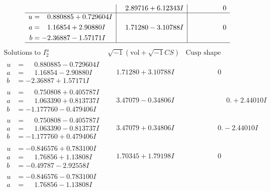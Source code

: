 \documentclass[1p]{elsarticle_modified}
\theoremstyle{definition}
\newcommand{\I}{\sqrt{-1}}
\begin{document}
$$\begin{array}{c|c|c}
 & \phantom{-}2.89716 + 6.12343 I & \phantom{-0.000000 } 0 \\ \hline\begin{aligned}
u &= \phantom{-}0.880885 + 0.729604 I \\
a &= \phantom{-}1.16854 + 2.90880 I \\
b &= -2.36887 - 1.57171 I\end{aligned}
 & \phantom{-}1.71280 - 3.10788 I & \phantom{-0.000000 } 0\\
 \hline 
 \end{array}$$\newpage$$\begin{array}{c|c|c}  
\text{Solutions to }I^u_{2}& \I (\text{vol} + \sqrt{-1}CS) & \text{Cusp shape}\\
 \hline 
\begin{aligned}
u &= \phantom{-}0.880885 - 0.729604 I \\
a &= \phantom{-}1.16854 - 2.90880 I \\
b &= -2.36887 + 1.57171 I\end{aligned}
 & \phantom{-}1.71280 + 3.10788 I & \phantom{-0.000000 } 0 \\ \hline\begin{aligned}
u &= \phantom{-}0.750808 + 0.405787 I \\
a &= \phantom{-}1.063390 + 0.813737 I \\
b &= -1.177760 - 0.479406 I\end{aligned}
 & \phantom{-}3.47079 - 0.34806 I & \phantom{-0.000000 -}0. + 2.44010 I \\ \hline\begin{aligned}
u &= \phantom{-}0.750808 - 0.405787 I \\
a &= \phantom{-}1.063390 - 0.813737 I \\
b &= -1.177760 + 0.479406 I\end{aligned}
 & \phantom{-}3.47079 + 0.34806 I & \phantom{-0.000000 } 0. - 2.44010 I \\ \hline\begin{aligned}
u &= -0.846576 + 0.783100 I \\
a &= \phantom{-}1.76856 + 1.13808 I \\
b &= -0.49787 - 2.92558 I\end{aligned}
 & \phantom{-}1.70345 + 1.79198 I & \phantom{-0.000000 } 0 \\ \hline\begin{aligned}
u &= -0.846576 - 0.783100 I \\
a &= \phantom{-}1.76856 - 1.13808 I \\

\end{aligned}
\end{array}$$
\end{document}
